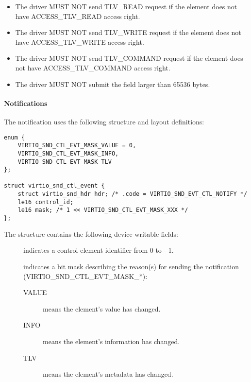 
\begin{itemize}
\item The driver MUST NOT send TLV_READ request if the element does not have
ACCESS_TLV_READ access right.
\item The driver MUST NOT send TLV_WRITE request if the element does not have
ACCESS_TLV_WRITE access right.
\item The driver MUST NOT send TLV_COMMAND request if the element does not have
ACCESS_TLV_COMMAND access right.
\item The driver MUST NOT submit the  field larger than 65536 bytes. 
\end{itemize}

\paragraph{Notifications}

The notification uses the following structure and layout definitions:

\begin{lstlisting}
enum {
    VIRTIO_SND_CTL_EVT_MASK_VALUE = 0,
    VIRTIO_SND_CTL_EVT_MASK_INFO,
    VIRTIO_SND_CTL_EVT_MASK_TLV
};

struct virtio_snd_ctl_event {
    struct virtio_snd_hdr hdr; /* .code = VIRTIO_SND_EVT_CTL_NOTIFY */
    le16 control_id;
    le16 mask; /* 1 << VIRTIO_SND_CTL_EVT_MASK_XXX */
};
\end{lstlisting}

The structure contains the following device-writable fields:

\begin{description}
\item[] indicates a control element identifier from 0 to
 - 1.
\item[] indicates a bit mask describing the reason(s) for sending
the notification (VIRTIO_SND_CTL_EVT_MASK_*):
\begin{description}
\item[VALUE] means the element's value has changed.
\item[INFO] means the element's information has changed.
\item[TLV] means the element's metadata has changed.
\end{description}
\end{description}

